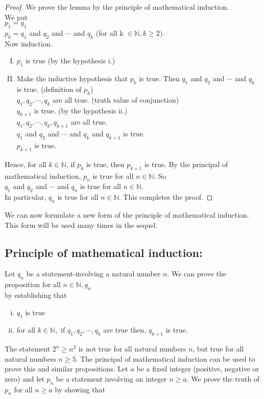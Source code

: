 \documentclass[12 pt]{article}
\begin{document}
\begin{proof}
We prove the lemma by the principle of mathematical induction. \\
We put\\
$ p_1 = q_1 $\\
$ p_k = q_1 $ and $ q_2 $ and $ \cdots $ and $ q_k $  (for all k $ \in \mathbb{N}, k \ge 2 )$.\\
Now induction.
\begin{enumerate}[I.]
  \item $ p_1 $ is true (by the hypothesis i.)
  \item Make the inductive hypothesis that $ p_k $ is true. Then $ q_1 $ and $ q_2 $ and $ \cdots $ and $ q_k $ is true. (definition of $ p_k $)\\ 
  $ q_1, q_2, \cdots , q_k $ are all true. (truth value of conjunction)\\
  $ q_{k+1} $ is true. (by the hypothesis ii.)\\
  $ q_1, q_2, \cdots , q_k, q_{k+1} $ are all true. \\
  $ q_1 $ and $ q_2 $ and $ \cdots $ and $ q_k $ and $ q_{k+1} $ is true.\\
  $ p_{k+1} $ is true.\\ 
  
\end{enumerate}
Hence, for all $ k \in \mathbb{N} $, if $ p_k $ is true, then $ p_{k+1} $ is true. By the principal of mathematical induction, $ p_n $ is true for all $ n \in \mathbb{N} $. So\\
$ q_1 $ and $ q_2 $ and $ \cdots $ and $ q_n $ is true for all $ n \in \mathbb{N} $.\\
In particular, $ q_n $ is true for all $ n \in \mathbb{N} $. This completes the proof. 
\end{proof} 

We can now formulate a new form of the principle of mathematical induction. This form will be used many times in the sequel. 

\subsection{Principle of mathematical induction:}
Let $ q_n $ be a statement-involving a natural number $ n $. We can prove the proposition for all $ n \in \mathbb{N}, q_n $\\
by establishing that

\begin{enumerate}[i.]
  \item $ q_1 $ is true
  \item for all $ k \in \mathbb{N}, $ if $ q_1, q_2, \cdots , q_k $ are true then, $ q_{k+1} $ is true. 
\end{enumerate}

The statement $ 2^n \ge n^2 $ is not true for all natural numbers $ n $, but true for all natural numbers $ n \ge 5 $. The principal of mathematical induction can be used to prove this and similar propositions. Let $ a $ be a fixed integer (positive, negative or zero) and let $ p_n $ be a statement involving an integer $ n \ge a $. We prove the truth of $ p_n $ for all $ n \ge a $ by showing that 
\end{document}
